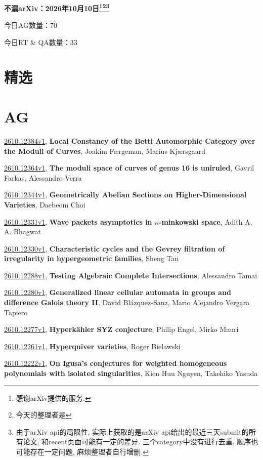 \documentclass[9pt, a4paper]{article}
\theoremstyle{plain}
\theoremstyle{definition}
\theoremstyle{remark}
\newcommand{\arxiv}[3]{\href{https://arxiv.org/abs/#1}{#1}, \textbf{\textcolor{arxivblue}{#2}}, #3}
\newcommand{\AGnumber}{70}
\newcommand{\RTQAnumber}{33}
\newcommand{\NewestDate}{2026年10月10日}
\newcommand{\todayarXiver}{} %
\begin{document}
\begin{center}
    \Huge\textbf{不漏arXiv：\NewestDate\footnote{感谢arXiv提供的服务.}\footnote{今天的整理者是\todayarXiver}\footnote{由于arXiv api的局限性, 实际上获取的是arXiv api给出的最近三天submit的所有论文, 和recent页面可能有一定的差异. 三个category中没有进行去重, 顺序也可能存在一定问题, 麻烦整理者自行增删.}} \\
\end{center}

\setcounter{section}{-1}

\begin{center}
    今日AG数量：\AGnumber
    
    今日RT \& QA数量：\RTQAnumber
    
\end{center}


\section{精选}


\section{AG}
\arxiv{2610.12384v1}{Local Constancy of the Betti Automorphic Category over the Moduli of Curves}{Joakim Færgeman, Marius Kjærsgaard}

\arxiv{2610.12364v1}{The moduli space of curves of genus 16 is uniruled}{Gavril Farkas, Alessandro Verra}

\arxiv{2610.12344v1}{Geometrically Abelian Sections on Higher-Dimensional Varieties}{Daebeom Choi}

\arxiv{2610.12331v1}{Wave packets asymptotics in $κ$-minkowski space}{Adith A, A. Bhagwat}

\arxiv{2610.12330v1}{Characteristic cycles and the Gevrey filtration of irregularity in hypergeometric families}{Sheng Tan}

\arxiv{2610.12288v1}{Testing Algebraic Complete Intersections}{Alessandro Tamai}

\arxiv{2610.12280v1}{Generalized linear cellular automata in groups and difference Galois theory II}{David Blázquez-Sanz, Mario Alejandro Vergara Tapiero}

\arxiv{2610.12277v1}{Hyperkähler SYZ conjecture}{Philip Engel, Mirko Mauri}

\arxiv{2610.12261v1}{Hyperquiver varieties}{Roger Bielawski}

\arxiv{2610.12222v1}{On Igusa's conjectures for weighted homogeneous polynomials with isolated singularities}{Kien Huu Nguyen, Takehiko Yasuda}
\end{document}
